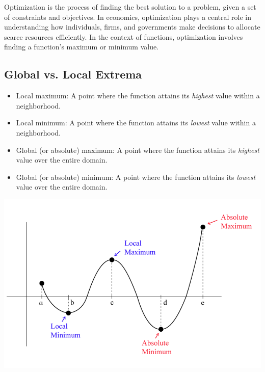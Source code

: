 \documentclass{./../Latex/handout}
\begin{document}
\thispagestyle{plain}

Optimization is the process of finding the best solution to a problem, given a set of constraints and objectives. In economics, optimization plays a central role in understanding how individuals, firms, and governments make decisions to allocate scarce resources efficiently. In the context of functions, optimization involves finding a function's maximum or minimum value. 

\vspace{-1em}
\subsection*{Global vs. Local Extrema}
\begin{itemize}
  \item Local maximum: A point where the function attains its \textit{highest} value within a neighborhood. 
 \item Local minimum: A point where the function attains its \textit{lowest} value within a neighborhood.
 \item Global (or absolute) maximum: A point where the function attains its \textit{highest} value over the entire domain.
 \item Global (or absolute) minimum: A point where the function attains its \textit{lowest} value over the entire domain.
 \end{itemize}
 
\begin{center}
\includegraphics[scale=0.4]{./Input/global_vs_local.png}	\\
\end{center} 
\end{document}
